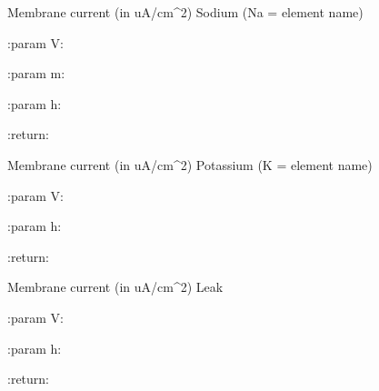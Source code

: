 \documentclass[letterpaper,10pt,english]{sphinxmanual}
\begin{document}
\begin{fulllineitems}

\begin{fulllineitems}
\label{_static/Hodgkin Huxley:Source.HodgkinHuxley.HodgkinHuxley.I_Na}
Membrane current (in uA/cm\textasciicircum{}2)
Sodium (Na = element name)

\begin{DUlineblock}{0em}
\item[] :param V:
\item[] :param m:
\item[] :param h:
\item[] :return:
\end{DUlineblock}

\end{fulllineitems}


\begin{fulllineitems}
\label{_static/Hodgkin Huxley:Source.HodgkinHuxley.HodgkinHuxley.I_K}
Membrane current (in uA/cm\textasciicircum{}2)
Potassium (K = element name)

\begin{DUlineblock}{0em}
\item[] :param V:
\item[] :param h:
\item[] :return:
\end{DUlineblock}

\end{fulllineitems}


\begin{fulllineitems}
\label{_static/Hodgkin Huxley:Source.HodgkinHuxley.HodgkinHuxley.I_L}
Membrane current (in uA/cm\textasciicircum{}2)
Leak

\begin{DUlineblock}{0em}
\item[] :param V:
\item[] :param h:
\item[] :return:
\end{DUlineblock}

\end{fulllineitems}


\end{fulllineitems}
\end{document}
